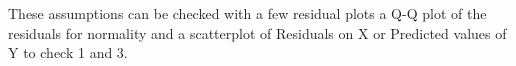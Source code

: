 \documentclass[residuals.tex]{subfiles}
\begin{document}
These assumptions can be checked with a few residual plots
a Q-Q plot of the residuals for normality and a scatterplot of Residuals on X or Predicted values of Y to check 1 and 3.


%
%
%
%


\end{document}
